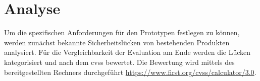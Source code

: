 \section{Analyse}
\label{sec:analysis}
	Um die spezifischen Anforderungen für den Prototypen festlegen zu können, werden zunächst bekannte Sicherheitslücken von bestehenden Produkten analysiert. 
	Für die Vergleichbarkeit der Evaluation am Ende werden die Lücken kategorisiert und nach dem \gls{cvss} bewertet.
	Die Bewertung wird mittels des bereitgestellten Rechners durchgeführt \url{https://www.first.org/cvss/calculator/3.0}.
